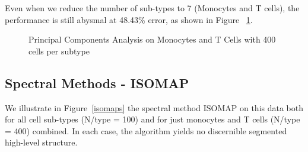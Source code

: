 \documentclass{article}
\begin{document}
Even when we reduce the number of sub-types to 7 (Monocytes and T cells), the performance is still abysmal at 48.43\% error, as shown in Figure ~\ref{pca_plots_monocytes&T}.

\begin{figure}[h]
\vskip 0.2in
\begin{center}
\quad
{}\quad
\end{center}
\caption{Principal Components Analysis on Monocytes and T Cells with 400 cells per subtype}
\label{pca_plots_monocytes&T}
\vskip -0.2in
\end{figure}

\subsection{Spectral Methods - ISOMAP}
We illustrate in Figure~\ref{isomaps} the spectral method ISOMAP on this data both for all cell sub-types (N/type = 100) and for just monocytes and T cells (N/type = 400) combined. In each case, the algorithm yields no discernible segmented high-level structure.
\end{document}
